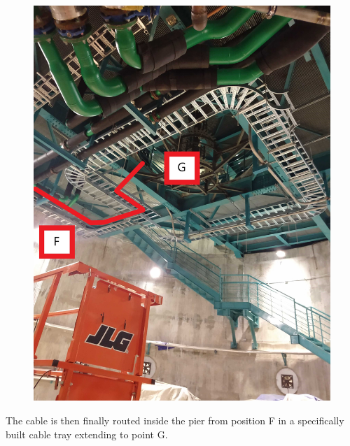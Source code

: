 \begin{figure}
  \includegraphics[width=\textwidth]{images/20.jpg}
  \label{fig:jlsimon}
\end{figure}

The cable is then finally routed inside the pier from position F in a specifically built cable tray extending to point G.

